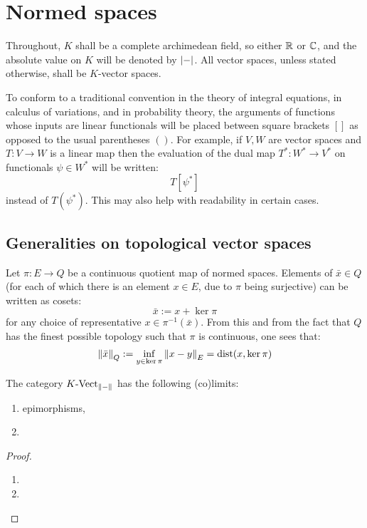 \section{Normed spaces}
    Throughout, $K$ shall be a complete archimedean field, so either $\mathbb{R}$ or $\mathbb{C}$, and the absolute value on $K$ will be denoted by $\left\lvert {-} \right\rvert$. All vector spaces, unless stated otherwise, shall be $K$-vector spaces.

    \begin{convention}
        To conform to a traditional convention in the theory of integral equations, in calculus of variations, and in probability theory, the arguments of functions whose inputs are linear functionals will be placed between square brackets $[]$ as opposed to the usual parentheses $()$. For example, if $V, W$ are vector spaces and $T: V \to W$ is a linear map then the evaluation of the dual map $T^*: W^* \to V^*$ on functionals $\psi \in W^*$ will be written:
            $$T[\psi^*]$$
        instead of $T(\psi^*)$. This may also help with readability in certain cases. 
    \end{convention}
 
    \subsection{Generalities on topological vector spaces}
        \begin{remark} \label{remark: quotient_norms}
            Let $\pi: E \to Q$ be a continuous quotient map of normed spaces. Elements of $\bar{x} \in Q$ (for each of which there is an element $x \in E$, due to $\pi$ being surjective) can be written as cosets:
                $$\bar{x} := x + \ker \pi$$
            for any choice of representative $x \in \pi^{-1}(\bar{x})$. From this and from the fact that $Q$ has the finest possible topology such that $\pi$ is continuous, one sees that:
                $$\left\| {\bar{x}} \right\|_Q := \inf_{y \in \ker \pi} \left\| {x - y} \right\|_E = \operatorname{dist}(x, \ker \pi)$$
        \end{remark}
        \begin{lemma}
            The category $K\text{-}\mathrm{Vect}_{\left\| {-} \right\|}$ has the following (co)limits:
            \begin{enumerate}
                \item epimorphisms,
                \item 
            \end{enumerate}
        \end{lemma}
            \begin{proof}
                \begin{enumerate}
                    \item 
                    \item 
                \end{enumerate}
            \end{proof}


